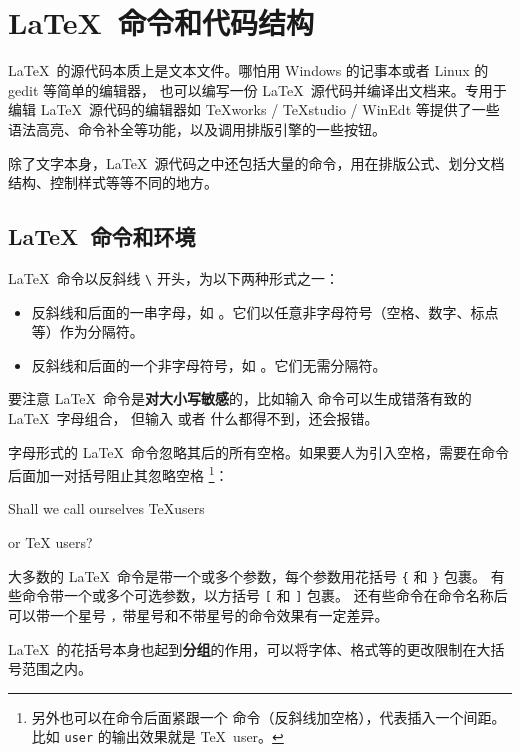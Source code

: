 \section{\LaTeX\ 命令和代码结构}\label{sec:src}

\LaTeX\ 的源代码本质上是文本文件。哪怕用 Windows 的记事本或者 Linux 的 gedit 等简单的编辑器，
也可以编写一份 \LaTeX\ 源代码并编译出文档来。专用于编辑 \LaTeX\ 源代码的编辑器如
TeXworks / TeXstudio / WinEdt 等提供了一些语法高亮、命令补全等功能，以及调用排版引擎的一些按钮。

除了文字本身，\LaTeX\ 源代码之中还包括大量的命令，用在排版公式、划分文档结构、控制样式等等不同的地方。

\subsection{\LaTeX\ 命令和环境}\label{subsec:cmds}

\LaTeX\ 命令以反斜线 \texttt{\textbackslash} 开头，为以下两种形式之一：
\begin{itemize}
  \item 反斜线和后面的一串字母，如 。它们以任意非字母符号（空格、数字、标点等）作为分隔符。
  \item 反斜线和后面的一个非字母符号，如 \cmd{\$}。它们无需分隔符。
\end{itemize}

要注意 \LaTeX\ 命令是\textbf{对大小写敏感}的，比如输入  命令可以生成错落有致的 \LaTeX\ 字母组合，
但输入  或者  什么都得不到，还会报错。

字母形式的 \LaTeX\ 命令忽略其后的所有空格。如果要人为引入空格，需要在命令后面加一对括号阻止其忽略空格%
\footnote{另外也可以在命令后面紧跟一个 \cmd{\textvisiblespace} 命令（反斜线加空格），代表插入一个间距。
比如 \cmd{\textvisiblespace}\texttt{user} 的输出效果就是 \TeX\ user。}：
\begin{example}
Shall we call ourselves 
\TeX users 

or \TeX{} users?
\end{example}

大多数的 \LaTeX\ 命令是带一个或多个参数，每个参数用花括号 \texttt\{ 和 \texttt\} 包裹。
有些命令带一个或多个可选参数，以方括号 \texttt[ 和 \texttt] 包裹。
还有些命令在命令名称后可以带一个星号 \texttt*，带星号和不带星号的命令效果有一定差异。

\LaTeX\ 的花括号本身也起到\textbf{分组}的作用，可以将字体、格式等的更改限制在大括号范围之内。

